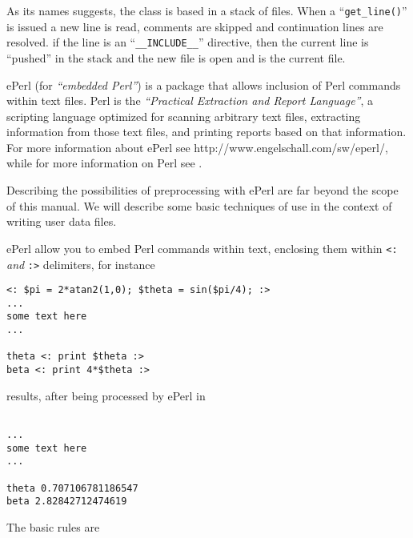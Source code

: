
As its names suggests, the class is based in a stack of files. When a 
``\verb+get_line()+'' is issued a new line is read, comments are
skipped and continuation lines are resolved. if the line is an
``\verb+__INCLUDE__+'' directive, then the current line is ``pushed''
in the stack and the new file is open and is the current file. 

\label{sec:eperl}  

%
ePerl (for \emph{``embedded Perl''}) is a package that allows
inclusion of Perl commands within text files. Perl is the
\emph{``Practical Extraction and Report Language''}, a scripting
language optimized for scanning arbitrary text files, extracting
information from those text files, and printing reports based on that
information. For more information about ePerl see
{http://www.engelschall.com/sw/eperl/}, while for more information on
Perl see .

Describing the possibilities of preprocessing with ePerl are far
beyond the scope of this manual. We will describe some basic
techniques of use in the context of writing \pfem{} user data files. 


ePerl allow you to embed Perl commands within text, enclosing them
within \verb+<:+\emph{ and  }\verb+:>+ delimiters, for instance

\begin{verbatim}
<: $pi = 2*atan2(1,0); $theta = sin($pi/4); :>
...
some text here
...

theta <: print $theta :>
beta <: print 4*$theta :>
\end{verbatim}

results, after being processed by ePerl in

\begin{verbatim}
 
...
some text here
...

theta 0.707106781186547
beta 2.82842712474619
\end{verbatim}

The basic rules are

